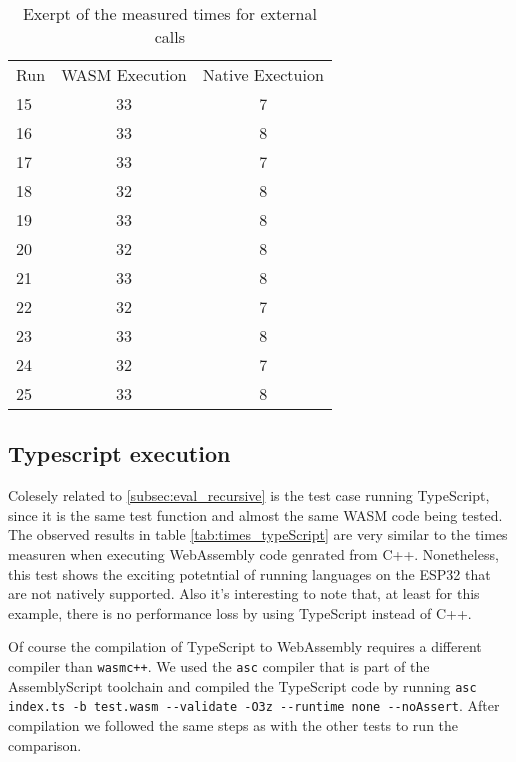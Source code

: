 \begin{table} [h]
    \begin{tabular}{l c c}
        Run & WASM Execution & Native Exectuion \\
        15  & 33             & 7                \\
        16  & 33             & 8                \\
        17  & 33             & 7                \\
        18  & 32             & 8                \\
        19  & 33             & 8                \\
        20  & 32             & 8                \\
        21  & 33             & 8                \\
        22  & 32             & 7                \\
        23  & 33             & 8                \\
        24  & 32             & 7                \\
        25  & 33             & 8                \\
    \end{tabular}
    \caption{Exerpt of the measured times for external calls}
    \label{tab:times_native}
\end{table}

\subsection{Typescript execution}

Colesely related to \ref{subsec:eval_recursive} is the test case running TypeScript, since it is the same test function and almost the same WASM code being tested. The observed results in table \ref{tab:times_typeScript} are very similar to the times measuren when executing WebAssembly code genrated from C++. Nonetheless, this test shows the exciting potetntial of running languages on the ESP32 that are not natively supported. Also it's interesting to note that, at least for this example, there is no performance loss by using TypeScript instead of C++.

\begin{sloppypar}
    Of course the compilation of TypeScript to WebAssembly requires a different compiler than \lstinline{wasmc++}. We used the \lstinline{asc} compiler that is part of the AssemblyScript toolchain and compiled the TypeScript code by running \lstinline{asc index.ts -b test.wasm --validate -O3z --runtime none --noAssert}. After compilation we followed the same steps as with the other tests to run the comparison.
\end{sloppypar}

